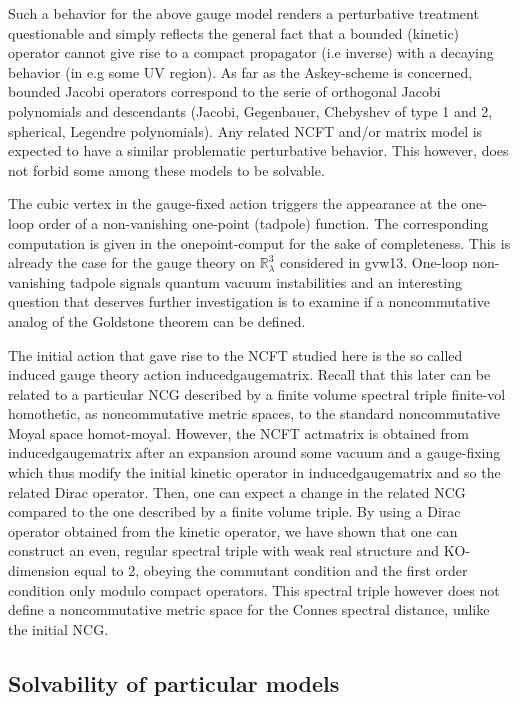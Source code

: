 \documentclass[10pt]{book}
\theoremstyle{break}
\begin{document}
Such a behavior for the above gauge model renders a perturbative treatment questionable and simply reflects the general fact that a bounded (kinetic) operator cannot give rise to a compact propagator (i.e inverse) with a decaying behavior (in e.g some UV region). As far as the Askey-scheme is concerned, bounded Jacobi operators correspond to the serie of orthogonal Jacobi polynomials and descendants (Jacobi, Gegenbauer, Chebyshev of type 1 and 2, spherical, Legendre polynomials). Any related NCFT and/or matrix model is expected to have a similar problematic perturbative behavior. This however, does not forbid some among these models to be solvable.\par

The cubic vertex in the gauge-fixed action triggers the appearance at the one-loop order of a non-vanishing one-point (tadpole) function. The corresponding computation is given in the {onepoint-comput} for the sake of completeness. This is already the case for the gauge theory on $\mathbb{R}^3_\lambda$ considered in {gvw13}. One-loop non-vanishing tadpole signals quantum vacuum instabilities and an interesting question that deserves further investigation is to examine if a noncommutative analog of the Goldstone theorem can be defined.\par

The initial action that gave rise to the NCFT studied here is the so called induced gauge theory action {inducedgaugematrix}. Recall that this later can be related to a particular NCG described by a finite volume spectral triple {finite-vol} homothetic, as noncommutative metric spaces, to the standard noncommutative Moyal space {homot-moyal}. However, the NCFT {actmatrix} is obtained from {inducedgaugematrix} after an expansion around some vacuum and a gauge-fixing which thus modify the initial kinetic operator in {inducedgaugematrix} and so the related Dirac operator. Then, one can expect a change in the related NCG compared to the one described by a finite volume triple. By using a Dirac operator obtained from the kinetic operator, we have shown that one can construct an even, regular spectral triple with weak real structure and KO-dimension equal to 2, obeying the commutant condition and the first order condition only modulo compact operators. This spectral triple however does not define a noncommutative metric space for the Connes spectral distance, unlike the initial NCG.\par


\subsection{Solvability of particular models}
\end{document}
